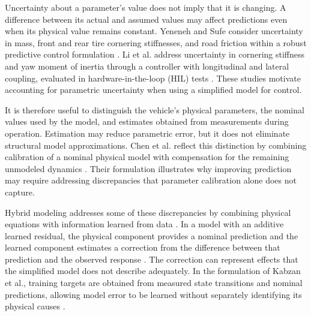 \documentclass[12pt,a4paper]{report}
\begin{document}
Uncertainty about a parameter's value does not imply that it is changing. A difference between its actual and assumed values may affect predictions even when its physical value remains constant. Yeneneh and Sufe consider uncertainty in mass, front and rear tire cornering stiffnesses, and road friction within a robust predictive control formulation \cite{Yeneneh2026AutoDyn}. Li et al. address uncertainty in cornering stiffness and yaw moment of inertia through a controller with longitudinal and lateral coupling, evaluated in hardware-in-the-loop (HIL) tests \cite{Li2026TrajectoryTracking}. These studies motivate accounting for parametric uncertainty when using a simplified model for control.

It is therefore useful to distinguish the vehicle's physical parameters, the nominal values used by the model, and estimates obtained from measurements during operation. Estimation may reduce parametric error, but it does not eliminate structural model approximations. Chen et al. reflect this distinction by combining calibration of a nominal physical model with compensation for the remaining unmodeled dynamics \cite{Chen2026DataMechanism}. Their formulation illustrates why improving prediction may require addressing discrepancies that parameter calibration alone does not capture.

%

Hybrid modeling addresses some of these discrepancies by combining physical equations with information learned from data \cite{Cheng2025Deep,Zhou2025Hybrid}. In a model with an additive learned residual, the physical component provides a nominal prediction and the learned component estimates a correction from the difference between that prediction and the observed response \cite{Kabzan2019LearningBased,Chen2026Hybrid}. The correction can represent effects that the simplified model does not describe adequately. In the formulation of Kabzan et al., training targets are obtained from measured state transitions and nominal predictions, allowing model error to be learned without separately identifying its physical causes \cite{Kabzan2019LearningBased}.
\end{document}
